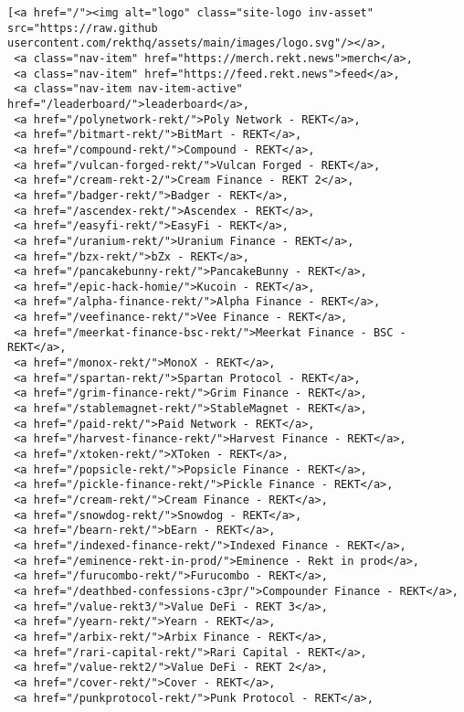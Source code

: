 \documentclass[11pt]{article}
\makeatletter
\newcommand{\boxspacing}{\kern\kvtcb@left@rule\kern\kvtcb@boxsep}
\newcommand{\prompt}[4]{
        {\ttfamily\llap{{\color{#2}[#3]:\hspace{3pt}#4}}\vspace{-\baselineskip}}
    }
\makeatother
\begin{document}
            \begin{tcolorbox}[breakable, size=fbox, boxrule=.5pt, pad at break*=1mm, opacityfill=0]
\prompt{Out}{outcolor}{12}{\boxspacing}
\begin{Verbatim}[commandchars=\\\{\}]
[<a href="/"><img alt="logo" class="site-logo inv-asset" src="https://raw.github
usercontent.com/rekthq/assets/main/images/logo.svg"/></a>,
 <a class="nav-item" href="https://merch.rekt.news">merch</a>,
 <a class="nav-item" href="https://feed.rekt.news">feed</a>,
 <a class="nav-item nav-item-active" href="/leaderboard/">leaderboard</a>,
 <a href="/polynetwork-rekt/">Poly Network - REKT</a>,
 <a href="/bitmart-rekt/">BitMart - REKT</a>,
 <a href="/compound-rekt/">Compound - REKT</a>,
 <a href="/vulcan-forged-rekt/">Vulcan Forged - REKT</a>,
 <a href="/cream-rekt-2/">Cream Finance - REKT 2</a>,
 <a href="/badger-rekt/">Badger - REKT</a>,
 <a href="/ascendex-rekt/">Ascendex - REKT</a>,
 <a href="/easyfi-rekt/">EasyFi - REKT</a>,
 <a href="/uranium-rekt/">Uranium Finance - REKT</a>,
 <a href="/bzx-rekt/">bZx - REKT</a>,
 <a href="/pancakebunny-rekt/">PancakeBunny - REKT</a>,
 <a href="/epic-hack-homie/">Kucoin - REKT</a>,
 <a href="/alpha-finance-rekt/">Alpha Finance - REKT</a>,
 <a href="/veefinance-rekt/">Vee Finance - REKT</a>,
 <a href="/meerkat-finance-bsc-rekt/">Meerkat Finance - BSC - REKT</a>,
 <a href="/monox-rekt/">MonoX - REKT</a>,
 <a href="/spartan-rekt/">Spartan Protocol - REKT</a>,
 <a href="/grim-finance-rekt/">Grim Finance - REKT</a>,
 <a href="/stablemagnet-rekt/">StableMagnet - REKT</a>,
 <a href="/paid-rekt/">Paid Network - REKT</a>,
 <a href="/harvest-finance-rekt/">Harvest Finance - REKT</a>,
 <a href="/xtoken-rekt/">XToken - REKT</a>,
 <a href="/popsicle-rekt/">Popsicle Finance - REKT</a>,
 <a href="/pickle-finance-rekt/">Pickle Finance - REKT</a>,
 <a href="/cream-rekt/">Cream Finance - REKT</a>,
 <a href="/snowdog-rekt/">Snowdog - REKT</a>,
 <a href="/bearn-rekt/">bEarn - REKT</a>,
 <a href="/indexed-finance-rekt/">Indexed Finance - REKT</a>,
 <a href="/eminence-rekt-in-prod/">Eminence - Rekt in prod</a>,
 <a href="/furucombo-rekt/">Furucombo - REKT</a>,
 <a href="/deathbed-confessions-c3pr/">Compounder Finance - REKT</a>,
 <a href="/value-rekt3/">Value DeFi - REKT 3</a>,
 <a href="/yearn-rekt/">Yearn - REKT</a>,
 <a href="/arbix-rekt/">Arbix Finance - REKT</a>,
 <a href="/rari-capital-rekt/">Rari Capital - REKT</a>,
 <a href="/value-rekt2/">Value DeFi - REKT 2</a>,
 <a href="/cover-rekt/">Cover - REKT</a>,
 <a href="/punkprotocol-rekt/">Punk Protocol - REKT</a>,

\end{Verbatim}
\end{tcolorbox}
\end{document}
